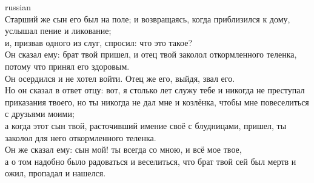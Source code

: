 \documentclass[10pt]{article} %
\begin{document}
{\begin{minipage}[t]{0.45\textwidth}
\begin{otherlanguage*}{russian}
\\
Старший же сын его был на поле; и возвращаясь, когда приблизился к дому, услышал пение и ликование;
\\
и, призвав одного из слуг, спросил: что это такое?
\\
Он сказал ему: брат твой пришел, и отец твой заколол откормленного теленка, потому что принял его здоровым.
\\
Он осердился и не хотел войти. Отец же его, выйдя, звал его.
\\
Но он сказал в ответ отцу: вот, я столько лет служу тебе и никогда не преступал приказания твоего, но ты никогда не дал мне и козлёнка, чтобы мне повеселиться с друзьями моими;
\\
а когда этот сын твой, расточивший имение своё с блудницами, пришел, ты заколол для него откормленного теленка.
\\
Он же сказал ему: сын мой! ты всегда со мною, и всё мое твое,
\\
а о том надобно было радоваться и веселиться, что брат твой сей был мертв и ожил, пропадал и нашелся.
\\

\end{otherlanguage*}
\end{minipage}
\hfill
\begin{minipage}[t]{0.45\textwidth}


\end{minipage}}
\end{document}
